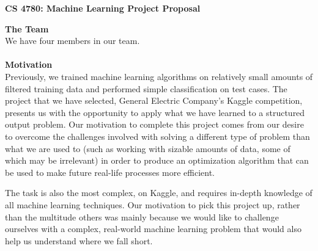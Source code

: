 \documentclass{article}[9pt]
\begin{document}
\begin{framed}
\noindent
\large{\textbf{CS 4780: Machine Learning \hfill Project Proposal}}
\end{framed}

\noindent\Large{\textbf{The Team}}\\
\noindent We have four members in our team.\\\\
\noindent\Large{\textbf{Motivation}}\\
\noindent Previously, we trained machine learning algorithms on relatively small amounts of filtered training data and performed simple classification on test cases. The project that we have selected, General Electric Company's Kaggle competition, presents us with the opportunity to apply what we have learned to a structured output problem. Our motivation to complete this project comes from our desire to overcome the challenges involved with solving a different type of problem than what we are used to (such as working with sizable amounts of data, some of which may be irrelevant) in order to produce an optimization algorithm that can be used to make future real-life processes more efficient.

The task is also the most complex, on Kaggle, and requires in-depth knowledge of all machine learning techniques. Our motivation to pick this project up, rather than the multitude others was mainly because we would like to challenge ourselves with a complex, real-world machine learning problem that would also help us understand where we fall short.
\end{document}
